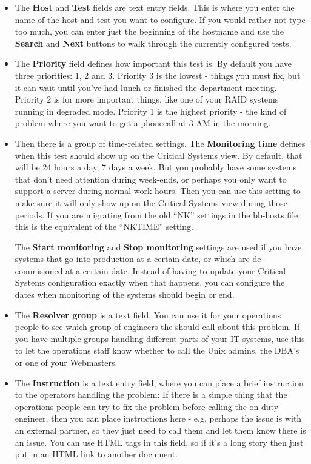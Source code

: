 \begin{itemize}

\item The \textbf{Host}
 and \textbf{Test} fields are text entry fields. This is where you
 enter the name of the host and test you want to configure. If you
 would rather not type too much, you can enter just the beginning of
 the hostname and use the \textbf{Search} and \textbf{Next} buttons to
 walk through the currently configured tests.

\item The \textbf{Priority}
 field defines how important this test is. By default you have three
 priorities: 1, 2 and 3. Priority 3 is the lowest - things you must
 fix, but it can wait until you've had lunch or finished the
 department meeting. Priority 2 is for more important things, like one
 of your RAID systems running in degraded mode. Priority 1 is the
 highest priority - the kind of problem where you want to get a
 phonecall at 3 AM in the morning.

\item Then there is a group of time-related settings. The \textbf{Monitoring time}
 defines when this test should show up on the Critical Systems
 view. By default, that will be 24 hours a day, 7 days a week. But you
 probably have some systems that don't need attention during
 week-ends, or perhaps you only want to support a server during normal
 work-hours. Then you can use this setting to make sure it will only
 show up on the Critical Systems view during those periods. If you are
 migrating from the old ``NK'' settings in the bb-hosts file, this is
 the equivalent of the ``NKTIME'' setting. 

 The \textbf{Start monitoring} and \textbf{Stop monitoring} settings
 are used if you have systems that go into production at a certain
 date, or which are de-commisioned at a certain date. Instead of
 having to update your Critical Systems configuration exactly when
 that happens, you can configure the dates when monitoring of the
 systems should begin or end.

\item The \textbf{Resolver group}
 is a text field. You can use it for your operations people to see
 which group of engineers the should call about this problem. If you
 have multiple groups handling different parts of your IT systems, use
 this to let the operations staff know whether to call the Unix
 admins, the DBA's or one of your Webmasters.

\item The \textbf{Instruction}
 is a text entry field, where you can place a brief instruction to the
 operators handling the problem: If there is a simple thing that the
 operations people can try to fix the problem before calling the
 on-duty engineer, then you can place instructions here - e.g. perhaps
 the issue is with an external partner, so they just need to call them
 and let them know there is an issue. You can use HTML tags in this
 field, so if it's a long story then just put in an HTML link to
 another document.


\end{itemize}
